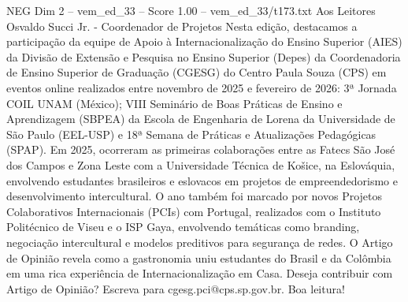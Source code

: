 \begin{textsample}{NEG Dim 2 – vem\_ed\_33 – Score 1.00 – vem\_ed\_33/t173.txt}  \label{ex:f2_neg_032}
Aos Leitores Osvaldo Succi Jr. - Coordenador de Projetos Nesta edição, destacamos a participação da equipe de Apoio à Internacionalização do Ensino Superior (AIES) da Divisão de Extensão e Pesquisa no Ensino Superior (Depes) da Coordenadoria de Ensino Superior de Graduação (CGESG) do Centro Paula Souza (CPS) em eventos online realizados entre novembro de 2025 e fevereiro de 2026: 3ª Jornada COIL UNAM (México); VIII Seminário de Boas Práticas de Ensino e Aprendizagem (SBPEA) da Escola de Engenharia de Lorena da Universidade de São Paulo (EEL-USP) e 18ª Semana de Práticas e Atualizações Pedagógicas (SPAP).
Em 2025, ocorreram as primeiras colaborações entre as Fatecs São José dos Campos e Zona Leste com a Universidade Técnica de Košice, na Eslováquia, envolvendo estudantes brasileiros e eslovacos em projetos de empreendedorismo e desenvolvimento intercultural.
O ano também foi marcado por novos Projetos Colaborativos Internacionais (PCIs) com Portugal, realizados com o Instituto Politécnico de Viseu e o ISP Gaya, envolvendo temáticas como branding, negociação intercultural e modelos preditivos para segurança de redes.
O Artigo de Opinião revela como a gastronomia uniu estudantes do Brasil e da Colômbia em uma rica experiência de Internacionalização em Casa.
Deseja contribuir com Artigo de Opinião?
Escreva para cgesg.pci@cps.sp.gov.br.
Boa leitura!

\end{textsample}
